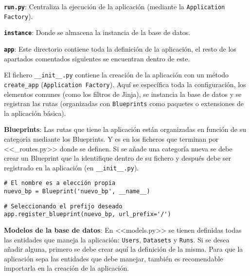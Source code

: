 \textbf{\texttt{run.py}}: Centraliza la ejecución de la aplicación (mediante la
\texttt{Application Factory}).

\textbf{\texttt{instance}}: Donde se almacena la instancia de la base de datos.

\textbf{\texttt{app}}: Este directorio contiene toda la definición de la
aplicación, el resto de los apartados comentados siguientes se encuentran dentro
de este.

El fichero \texttt{\_\_init\_\_.py} contiene la creación de la aplicación con un
método \texttt{create\_app} (\texttt{Application Factory}). Aquí se específica
toda la configuración, los elementos comunes (como los filtros de Jinja), se
instancia la base de datos y se registran las rutas (organizadas con
\texttt{Blueprints} como paquetes o extensiones de la aplicación básica).

\textbf{Blueprints}: Las rutas que tiene la aplicación están organizadas en
función de su categoría mediante los Blueprints. Y es en los ficheros que
terminan por <<\_routes.py>> donde se definen. Si se añade una categoría nueva
se debe crear un Blueprint que la identifique dentro de su fichero y después
debe ser registrado en la aplicación (en \texttt{\_\_init\_\_.py}).

\begin{tcolorbox}[colback=cyan!5!white,colframe=cyan!75!black,title=Crear Blueprint]
\begin{verbatim}
# El nombre es a elección propia
nuevo_bp = Blueprint('nuevo_bp', __name__)
\end{verbatim}
\end{tcolorbox}

\begin{tcolorbox}[colback=cyan!5!white,colframe=cyan!75!black,title=Registrar Blueprint en la aplicación (en \texttt{\_\_init\_\_.py})] 
\begin{verbatim}
# Seleccionando el prefijo deseado
app.register_blueprint(nuevo_bp, url_prefix='/') 
\end{verbatim}
\end{tcolorbox}

\textbf{Modelos de la base de datos}: En <<models.py>> se tienen definidas todas
las entidades que maneja la aplicación: \texttt{Users}, \texttt{Datasets} y
\texttt{Runs}. Si se desea añadir alguna, primero se debe crear aquí la
definición de la misma. Para que la aplicación sepa las entidades que debe
manejar, también es recomendable importarla en la creación de la aplicación.

